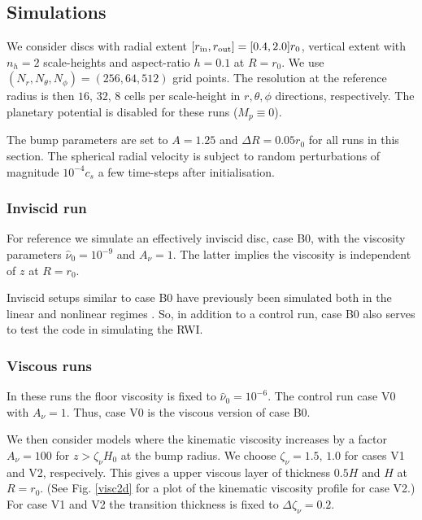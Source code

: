 \subsection{Simulations}
We consider discs with radial extent $[r_\mathrm{in},r_\mathrm{out}]=[0.4,2.0]r_0$,
vertical extent with $n_h=2$ scale-heights and aspect-ratio $h=0.1$ at
$R=r_0$. We use $(N_r, N_\theta,
N_\phi)=(256,64,512)$ grid points. 
The resolution at the reference radius is then
$16,\,32,\,8$ cells per scale-height in $r,\theta,\phi$ directions,
respectively. The planetary potential is disabled for these runs
($M_p\equiv 0$).    

The bump parameters are set to $A=1.25$ and $\Delta R = 0.05r_0$ for
all runs in this section. The spherical radial velocity is subject 
to random perturbations of magnitude 
$10^{-4}c_s$ a few time-steps after initialisation. 

\subsubsection{Inviscid run}
For reference we simulate an effectively inviscid disc, case B0,
with the viscosity parameters $\hat{\nu}_0=10^{-9}$ and $A_\nu = 1$.  
The latter implies the viscosity is independent of $z$ at $R=r_0$.   


Inviscid setups similar to case B0 have previously been simulated
both in the linear and nonlinear regimes  \citep{meheut12, lin13}. So,
in addition to a control run, case B0 also serves to test the \pluto
code in simulating the RWI.    

\subsubsection{Viscous runs}
In these runs the floor viscosity is fixed to
$\hat{\nu}_0=10^{-6}$. The control run  case V0 with $A_\nu =
1$. Thus, case V0 is the viscous version of case B0.  

We then consider models where the kinematic viscosity increases by
a factor $A_\nu=100$ for $z>\zeta_\nu H_0$ at the bump radius. We
choose $\zeta_\nu=1.5,\,1.0$ for cases V1 and V2, respecively.  This gives a upper 
viscous layer of thickness $0.5H$ and $H$ at $R=r_0$. (See
Fig. \ref{visc2d} for a plot of the kinematic viscosity profile for case V2.) 
For case V1 and V2 the transition thickness is fixed to
$\Delta\zeta_\nu=0.2$.  
 
